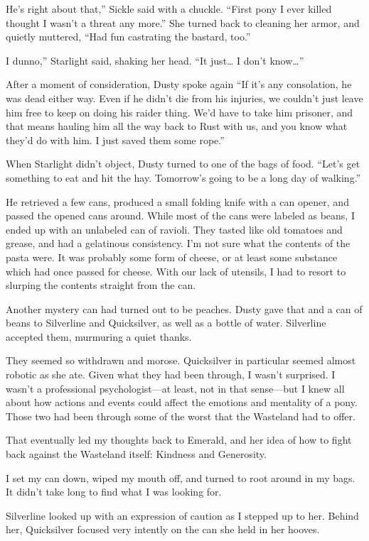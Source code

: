 \leavevmode{}He’s right about that,” Sickle said with a chuckle. “First pony I ever killed thought I wasn’t a threat any more.” She turned back to cleaning her armor, and quietly muttered, “Had fun castrating the bastard, too.”

\leavevmode{}I dunno,” Starlight said, shaking her head. “It just… I don’t know…”

After a moment of consideration, Dusty spoke again “If it’s any consolation, he was dead either way. Even if he didn’t die from his injuries, we couldn’t just leave him free to keep on doing his raider thing. We’d have to take him prisoner, and that means hauling him all the way back to Rust with us, and you know what they’d do with him. I just saved them some rope.”

When Starlight didn’t object, Dusty turned to one of the bags of food. “Let’s get something to eat and hit the hay. Tomorrow’s going to be a long day of walking.”

He retrieved a few cans, produced a small folding knife with a can opener, and passed the opened cans around. While most of the cans were labeled as beans, I ended up with an unlabeled can of ravioli. They tasted like old tomatoes and grease, and had a gelatinous consistency. I’m not sure what the contents of the pasta were. It was probably some form of cheese, or at least some substance which had once passed for cheese. With our lack of utensils, I had to resort to slurping the contents straight from the can.

Another mystery can had turned out to be peaches. Dusty gave that and a can of beans to Silverline and Quicksilver, as well as a bottle of water. Silverline accepted them, murmuring a quiet thanks.

They seemed so withdrawn and morose. Quicksilver in particular seemed almost robotic as she ate. Given what they had been through, I wasn’t surprised. I wasn’t a professional psychologist—at least, not in that sense—but I knew all about how actions and events could affect the emotions and mentality of a pony. Those two had been through some of the worst that the Wasteland had to offer.

That eventually led my thoughts back to Emerald, and her idea of how to fight back against the Wasteland itself: Kindness and Generosity.

I set my can down, wiped my mouth off, and turned to root around in my bags. It didn’t take long to find what I was looking for.

Silverline looked up with an expression of caution as I stepped up to her. Behind her, Quicksilver focused very intently on the can she held in her hooves.


